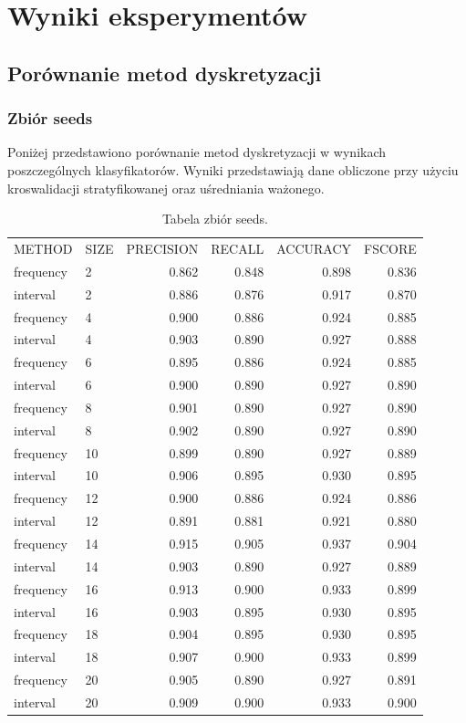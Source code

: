 \chapter{Wyniki eksperymentów}

\section{Porównanie metod dyskretyzacji}
\subsection{Zbiór seeds}
Poniżej przedstawiono porównanie metod dyskretyzacji w wynikach poszczególnych klasyfikatorów. Wyniki przedstawiają dane obliczone przy użyciu kroswalidacji stratyfikowanej oraz uśredniania ważonego.

\begin{table}[H]
\centering
\caption{Tabela zbiór seeds.}
\label{table-seeds}
\begin{tabular}{llrrrr}
METHOD    & SIZE & PRECISION & RECALL & ACCURACY & FSCORE \\
frequency & 2    & 0.862     & 0.848  & 0.898    & 0.836  \\
interval  & 2    & 0.886     & 0.876  & 0.917    & 0.870  \\
frequency & 4    & 0.900     & 0.886  & 0.924    & 0.885  \\
interval  & 4    & 0.903     & 0.890  & 0.927    & 0.888  \\
frequency & 6    & 0.895     & 0.886  & 0.924    & 0.885  \\
interval  & 6    & 0.900     & 0.890  & 0.927    & 0.890  \\
frequency & 8    & 0.901     & 0.890  & 0.927    & 0.890  \\
interval  & 8    & 0.902     & 0.890  & 0.927    & 0.890  \\
frequency & 10   & 0.899     & 0.890  & 0.927    & 0.889  \\
interval  & 10   & 0.906     & 0.895  & 0.930    & 0.895  \\
frequency & 12   & 0.900     & 0.886  & 0.924    & 0.886  \\
interval  & 12   & 0.891     & 0.881  & 0.921    & 0.880  \\
frequency & 14   & 0.915     & 0.905  & 0.937    & 0.904  \\
interval  & 14   & 0.903     & 0.890  & 0.927    & 0.889  \\
frequency & 16   & 0.913     & 0.900  & 0.933    & 0.899  \\
interval  & 16   & 0.903     & 0.895  & 0.930    & 0.895  \\
frequency & 18   & 0.904     & 0.895  & 0.930    & 0.895  \\
interval  & 18   & 0.907     & 0.900  & 0.933    & 0.899  \\
frequency & 20   & 0.905     & 0.890  & 0.927    & 0.891  \\
interval  & 20   & 0.909     & 0.900  & 0.933    & 0.900 
\end{tabular}
\end{table}
